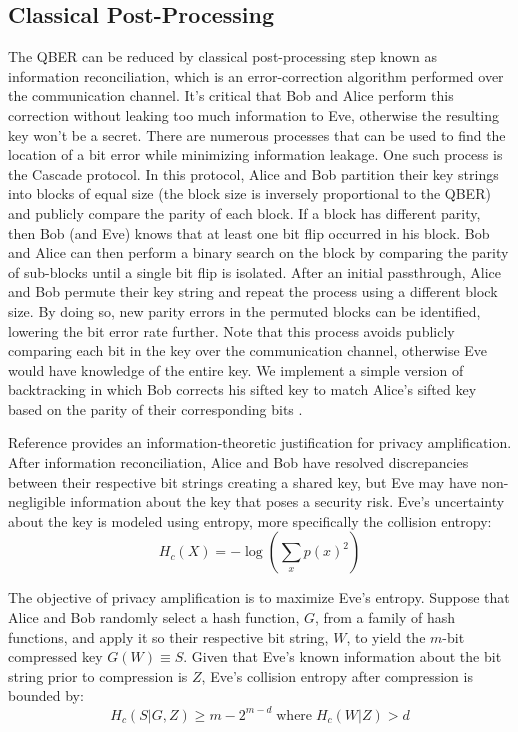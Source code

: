 \subsection{Classical Post-Processing} \label{sec:downstream}
The QBER can be reduced by classical post-processing step known as information reconciliation, which is an error-correction algorithm performed over the communication channel. It's critical that Bob and Alice perform this correction without leaking too much information to Eve, otherwise the resulting key won't be a secret. There are numerous processes that can be used to find the location of a bit error while minimizing information leakage. 
One such process is the Cascade protocol. In this protocol, Alice and Bob partition their key strings into blocks of equal size (the block size is inversely proportional to the QBER) and publicly compare the parity of each block. 
If a block has different parity, then Bob (and Eve) knows that at least one bit flip occurred in his block. Bob and Alice can then perform a binary search on the block by comparing the parity of sub-blocks until a single bit flip is isolated. 
After an initial passthrough, Alice and Bob permute their key string and repeat the process using a different block size. By doing so, new parity errors in the permuted blocks can be identified, lowering the bit error rate further. Note that this process avoids publicly comparing each bit in the key over the communication channel, otherwise Eve would have knowledge of the entire key.
We implement a simple version of backtracking in which Bob corrects his sifted key to match Alice's sifted key based on the parity of their corresponding bits \cite{reis2019qkd, 10210554}.

Reference \cite{nielsen2010quantum} provides an information-theoretic justification for privacy amplification. After information reconciliation, Alice and Bob have resolved discrepancies between their respective bit strings creating a shared key, but Eve may have non-negligible information about the  key that poses a security risk. Eve's uncertainty about the key is modeled using entropy, more specifically the collision entropy:
\begin{equation*}
    H_c(X) = -\log(\sum_x p(x)^2)
\end{equation*}

The objective of privacy amplification is to maximize Eve's entropy. Suppose that Alice and Bob randomly select a hash function, $G$, from a family of hash functions, and apply it so their respective bit string, $W$, to yield the $m$-bit compressed key $G(W) \equiv S$. Given that Eve's known information about the bit string prior to compression is $Z$, Eve's collision entropy after compression is bounded by:
\begin{equation*}
    H_c(S|G,Z) \ge m - 2^{m-d} \; \text{where} \; H_c(W|Z) > d
\end{equation*}

